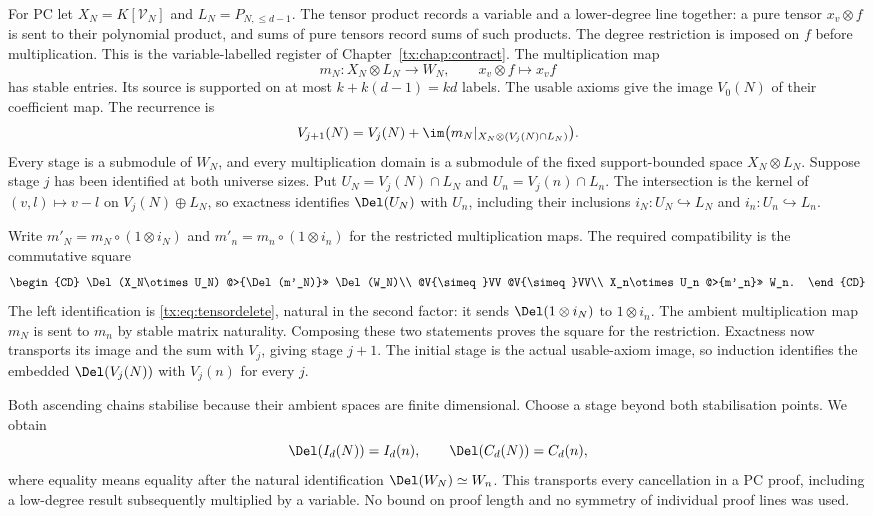 For PC let $X_N=K[\mathcal V_N]$ and $L_N=P_{N,\le d-1}$.
The tensor product records a variable and a lower-degree line together:
a pure tensor $x_v\otimes f$ is sent to their polynomial product,
and sums of pure tensors record sums of such products. The degree
restriction is imposed on $f$ before multiplication. This is the
variable-labelled register of Chapter~\ref{tx:chap:contract}.
The multiplication map
\[
       m_N:X_N\otimes L_N\longrightarrow W_N,\qquad
                 x_v\otimes f\longmapsto x_vf
\]
has stable entries. Its source is supported on at most
$k+k(d-1)=kd$ labels. The usable axioms give the image $V_0(N)$
of their coefficient map. The recurrence is
\[
 V_{j+1}(N)=V_j(N)+\im\bigl(m_N|_{X_N\otimes(V_j(N)\cap L_N)}\bigr).
\]
Every stage is a submodule of $W_N$, and every multiplication domain
is a submodule of the fixed support-bounded space $X_N\otimes L_N$.
Suppose stage $j$ has been identified at both universe sizes. Put
$U_N=V_j(N)\cap L_N$ and $U_n=V_j(n)\cap L_n$.
The intersection is the kernel of $(v,l)\mapsto v-l$ on
$V_j(N)\oplus L_N$, so exactness identifies $\Del(U_N)$ with
$U_n$, including their inclusions $i_N:U_N\hookrightarrow L_N$
and $i_n:U_n\hookrightarrow L_n$.

Write $m'_N=m_N\circ(1\otimes i_N)$ and
$m'_n=m_n\circ(1\otimes i_n)$ for the restricted multiplication
maps. The required compatibility is the commutative square
\begin{equation}\label{tx:eq:restricted-multiplication}
\begin{CD}
 \Del(X_N\otimes U_N) @>{\Del(m'_N)}>> \Del(W_N)\\
 @V{\simeq}VV @V{\simeq}VV\\
 X_n\otimes U_n @>{m'_n}>> W_n.
\end{CD}
\end{equation}
The left identification is \eqref{tx:eq:tensordelete}, natural in
the second factor: it sends $\Del(1\otimes i_N)$ to
$1\otimes i_n$. The ambient multiplication map $m_N$ is sent to
$m_n$ by stable matrix naturality. Composing these two statements
proves the square for the restriction. Exactness now transports its
image and the sum with $V_j$, giving stage $j+1$. The initial stage
is the actual usable-axiom image, so induction identifies the embedded
$\Del(V_j(N))$ with $V_j(n)$ for every $j$.

Both ascending chains stabilise because their ambient spaces are finite
dimensional. Choose a stage beyond both stabilisation points. We obtain
\begin{equation}\label{tx:eq:consequence-transport}
 \Del(I_d(N))=I_d(n),\qquad \Del(C_d(N))=C_d(n),
\end{equation}
where equality means equality after the natural identification
$\Del(W_N)\simeq W_n$. This transports every cancellation in a PC
proof, including a low-degree result subsequently multiplied by a
variable. No bound on proof length and no symmetry of individual proof
lines was used.

